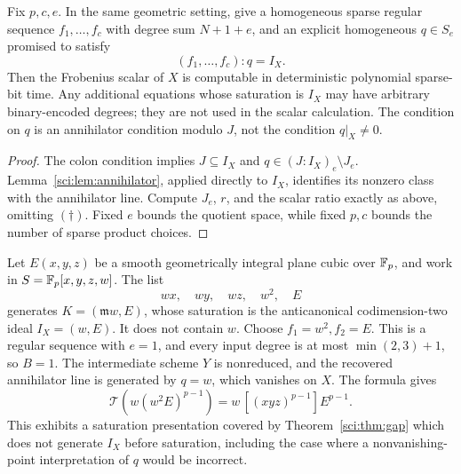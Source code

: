 \begin{corollary}
\label{sci:cor:certificate}
Fix \(p,c,e\). In the same geometric setting, give a homogeneous sparse
regular sequence \(f_1,\ldots,f_c\) with degree sum \(N+1+e\), and an
explicit homogeneous \(q\in S_e\) promised to satisfy
\[
 (f_1,\ldots,f_c):q=I_X.
 \]
Then the Frobenius scalar of \(X\) is computable in deterministic
polynomial sparse-bit time. Any additional equations whose saturation
is \(I_X\) may have arbitrary binary-encoded degrees; they are not used
in the scalar calculation. The condition on \(q\) is an annihilator
condition modulo \(J\), not the condition \(q|_X\ne0\).
\end{corollary}
\begin{proof}
The colon condition implies \(J\subseteq I_X\) and
\(q\in(J:I_X)_e\setminus J_e\). Lemma~\ref{sci:lem:annihilator},
applied directly to \(I_X\), identifies its nonzero class with the
annihilator line. Compute \(J_e\), \(r\), and the scalar ratio exactly
as above, omitting \((\dagger)\). Fixed \(e\) bounds the quotient
space, while fixed \(p,c\) bounds the number of sparse product choices.
\end{proof}

\begin{example}
\label{sci:ex:double}
Let \(E(x,y,z)\) be a smooth geometrically integral plane cubic over
\(\mathbb F_p\), and work in \(S=\mathbb F_p[x,y,z,w]\). The list
\[
 wx,\quad wy,\quad wz,\quad w^2,\quad E
 \]
generates \(K=(\mathfrak m w,E)\), whose saturation is the
anticanonical codimension-two ideal \(I_X=(w,E)\).
It does not contain \(w\). Choose \(f_1=w^2,f_2=E\).
This is a regular sequence with \(e=1\), and every input degree is at
most \(\min(2,3)+1\), so \(B=1\).
The intermediate scheme \(Y\) is nonreduced, and the recovered
annihilator line is generated by \(q=w\), which vanishes on \(X\).
The formula gives
\[
 \mathcal T\!\left(w(w^2E)^{p-1}\right)
 =w\,[(xyz)^{p-1}]E^{p-1}.
 \]
This exhibits a saturation presentation covered by
Theorem~\ref{sci:thm:gap} which does not generate \(I_X\) before
saturation, including the case where a nonvanishing-point
interpretation of \(q\) would be incorrect.
\end{example}

